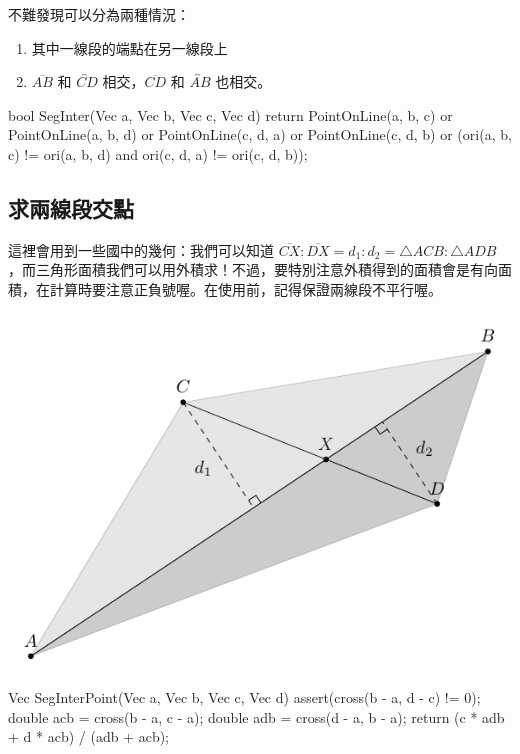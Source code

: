 \documentclass[main.tex]{subfiles}
\begin{document}
不難發現可以分為兩種情況：

\begin{enumerate}
	\item 其中一線段的端點在另一線段上
	\item $\overline{AB}$ 和 $\overleftrightarrow{CD}$ 相交，$\overline{CD}$ 和 $\overleftrightarrow{AB}$ 也相交。
\end{enumerate}

\begin{C++}
bool SegInter(Vec a, Vec b, Vec c, Vec d) {
	return PointOnLine(a, b, c) or PointOnLine(a, b, d)
		or PointOnLine(c, d, a) or PointOnLine(c, d, b)
		or (ori(a, b, c) != ori(a, b, d)
				and ori(c, d, a) != ori(c, d, b));
}
\end{C++}

\subsection{求兩線段交點}

這裡會用到一些國中的幾何：我們可以知道 $\overline{CX} : \overline{DX} = d_1 : d_2 = \triangle ACB : \triangle ADB$ ，而三角形面積我們可以用外積求！不過，要特別注意外積得到的面積會是有向面積，在計算時要注意正負號喔。在使用前，記得保證兩線段不平行喔。

\begin{center}
	\includegraphics*{images/Geometry/Basic/SegInterPoint.pdf}
\end{center}

\begin{C++}
Vec SegInterPoint(Vec a, Vec b, Vec c, Vec d) {
	assert(cross(b - a, d - c) != 0);
	double acb = cross(b - a, c - a);
	double adb = cross(d - a, b - a);
	return (c * adb + d * acb) / (adb + acb);
}
\end{C++}
\end{document}
